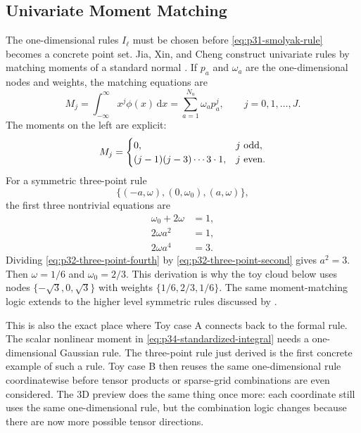 \documentclass[11pt]{article}
\numberwithin{equation}{section}
\newcommand{\dd}{\,\mathrm d}
\begin{document}
\subsection{Univariate Moment Matching}
\label{subsec:p32-univariate-moment-matching}

The one-dimensional rules \(I_\ell\) must be chosen before
\eqref{eq:p31-smolyak-rule} becomes a concrete point set.  Jia, Xin, and Cheng
construct univariate rules by matching moments of a standard normal
\cite[Section 3.2]{jia2012sparsegrid}.  If \(p_a\) and \(\omega_a\) are the
one-dimensional nodes and weights, the matching equations are
\begin{equation}
  M_j
  =
  \int_{-\infty}^{\infty}x^j\phi(x)\dd x
  =
  \sum_{a=1}^{N_u}\omega_a p_a^j,
  \qquad j=0,1,\ldots,J.
  \label{eq:p32-univariate-moment-match}
\end{equation}
The moments on the left are explicit:
\begin{equation}
  M_j=
  \begin{cases}
  0, & j\ \hbox{odd},\\
  (j-1)(j-3)\cdots 3\cdot 1, & j\ \hbox{even}.
  \end{cases}
  \label{eq:p32-normal-moments}
\end{equation}
For a symmetric three-point rule
\[
  \{(-a,\omega),(0,\omega_0),(a,\omega)\},
\]
the first three nontrivial equations are
\begin{align}
  \omega_0+2\omega&=1,
  \label{eq:p32-three-point-mass}\\
  2\omega a^2&=1,
  \label{eq:p32-three-point-second}\\
  2\omega a^4&=3.
  \label{eq:p32-three-point-fourth}
\end{align}
Dividing \eqref{eq:p32-three-point-fourth} by
\eqref{eq:p32-three-point-second} gives \(a^2=3\).  Then
\(\omega=1/6\) and \(\omega_0=2/3\).  This derivation is why the toy cloud
below uses nodes \(\{-\sqrt3,0,\sqrt3\}\) with weights
\(\{1/6,2/3,1/6\}\).  The same moment-matching logic extends to the higher
level symmetric rules discussed by \citet[Section 3.2]{jia2012sparsegrid}.

This is also the exact place where Toy case A connects back to the formal rule.
The scalar nonlinear moment in \eqref{eq:p34-standardized-integral} needs a
one-dimensional Gaussian rule.  The three-point rule just derived is the first
concrete example of such a rule.  Toy case B then reuses the same one-dimensional
rule coordinatewise before tensor products or sparse-grid combinations are even
considered.  The 3D preview does the same thing once more: each coordinate still
uses the same one-dimensional rule, but the combination logic changes because
there are now more possible tensor directions.
\end{document}
